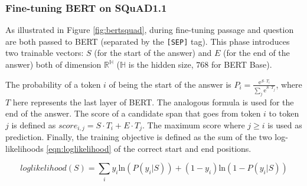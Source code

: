 \subsubsection{Fine-tuning BERT on SQuAD1.1}
As illustrated in Figure \ref{fig:bertsquad}, during fine-tuning passage and question are both passed to BERT (separated by the \texttt{[SEP]} tag). This phase introduces two trainable vectors: $S$ (for the start of the answer) and $E$ (for the end of the answer) both of dimension $\mathbb{R}^\mathbb{H}$ ($\mathbb{H}$ is the hidden size, $768$ for BERT Base). 

The probability of a token $i$ of being the start of the answer is $P_{i} = \frac{\mathrm{e}^{S \cdot T_{i}}}{\sum_{j} \mathrm{e}^{S \cdot T_{j}}}$, where $T$ here represents the last layer of BERT. The analogous formula is used for the end of the answer. The score of a candidate span that goes from token $i$ to token $j$ is defined as $score_{i, j} = S \cdot T_{i} + E \cdot T_{j}$. The maximum score where $j \geq i$ is used as prediction. Finally, the training objective is defined as the sum of the two log-likelihoods \eqref{eqn:loglikelihood} of the correct start and end positions.

\begin{equation}
\label{eqn:loglikelihood}
loglikelihood(S) = \sum_{i} y_{i} \mathrm{ln} (P(y_{i} | S)) + (1 - y_{i}) \mathrm{ln} (1 - P(y_{i} | S))
\end{equation}

